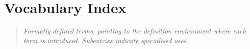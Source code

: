 \documentclass[11pt]{book}
\theoremstyle{plain}
\theoremstyle{definition}
\theoremstyle{remark}
\begin{document}
\printindex[topics]

\chapter*{Vocabulary Index}

\begin{quote}\small
\textit{Formally defined terms, pointing to the definition environment
where each term is introduced. Subentries indicate specialised uses.}
\end{quote}

\printindex[vocab]
\end{document}

